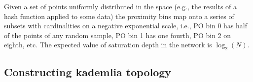\documentclass[a4paper,10pt,fullpage]{article}
\numberwithin{equation}{section}
\theoremstyle{definition}
\begin{document}
Given a set of points uniformly distributed in the space (e.g., the results of a hash function applied to some data) the proximity bins map onto a series of subsets with cardinalities on a negative exponential scale, i.e., PO bin 0 has half of the points of any random sample, PO bin 1 has one fourth, PO bin 2 on eighth, etc.
The expected value of saturation depth in the network is $\log_2(N)$. 

\subsection{Constructing kademlia topology}

\section{}
\printglossary
\end{document}

